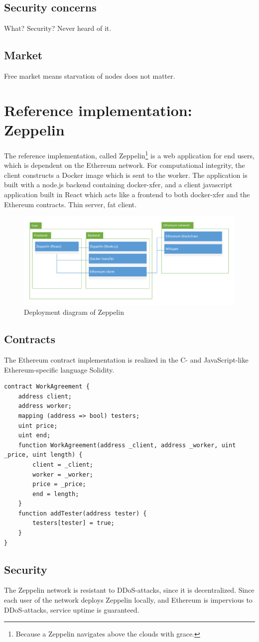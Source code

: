 \subsection{Security concerns}
What? Security? Never heard of it.

\subsection{Market}
Free market means starvation of nodes does not matter.

\section{Reference implementation: Zeppelin}
The reference implementation, called Zeppelin\footnote{Because a Zeppelin navigates above the clouds with grace.} is a web application for end users, which is dependent on the Ethereum network. For computational integrity, the client constructs a Docker image which is sent to the worker. The application is built with a node.js backend containing docker-xfer, and a client javascript application built in React which acts like a frontend to both docker-xfer and the Ethereum contracts. Thin server, fat client.

\begin{figure}[H]
\centering
\includegraphics[width=0.80\linewidth, trim=3cm 1cm 3cm 1cm]{figure/deployment.pdf}
\caption{Deployment diagram of Zeppelin}
\end{figure}

\subsection{Contracts}
The Ethereum contract implementation is realized in the C- and JavaScript-like Ethereum-specific language Solidity.
\begin{lstlisting}[caption={WorkAgreement contract}, label={lst:workagreement}]
contract WorkAgreement {
    address client;
    address worker;
    mapping (address => bool) testers;
    uint price;
    uint end;
    function WorkAgreement(address _client, address _worker, uint _price, uint length) {
        client = _client;
        worker = _worker;
        price = _price;
        end = length;
    }
    function addTester(address tester) {
        testers[tester] = true;
    }
}
\end{lstlisting}

\subsection{Security}
The Zeppelin network is resistant to DDoS-attacks, since it is decentralized. Since each user of the network deploys Zeppelin locally, and Ethereum is impervious to DDoS-attacks, service uptime is guaranteed. 

